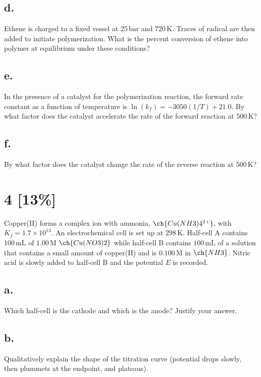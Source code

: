 \documentclass[11pt]{article}
\begin{document}
\subsection*{d.} Ethene is charged to a fixed vessel at $25\,\text{bar}$ and $720\,\text{K}$. Traces of radical are then added to initiate polymerization. What is the percent conversion of ethene into polymer at equilibrium under these conditions?
\vspace{4cm}

\subsection*{e.} In the presence of a catalyst for the polymerization reaction, the forward rate constant as a function of temperature is $\ln(k_f) = -3050(1/T) + 21.0$. By what factor does the catalyst accelerate the rate of the forward reaction at $500\,\text{K}$?
\vspace{3cm}

\subsection*{f.} By what factor does the catalyst change the rate of the reverse reaction at $500\,\text{K}$?
\vspace{2cm}

\newpage
\section{4 [13\%]}
Copper(II) forms a complex ion with ammonia, $\ch{Cu(NH3)4^{2+}}$, with $K_f = 1.7\times10^{13}$. An electrochemical cell is set up at $298\,\text{K}$. Half-cell A contains $100\,\text{mL}$ of $1.00\,\text{M}$ $\ch{Cu(NO3)2}$ while half-cell B contains $100\,\text{mL}$ of a solution that contains a small amount of copper(II) and is $0.100\,\text{M}$ in $\ch{NH3}$. Nitric acid is slowly added to half-cell B and the potential $E$ is recorded.

\subsection*{a.} Which half-cell is the cathode and which is the anode? Justify your answer.
\vspace{3cm}

\subsection*{b.} Qualitatively explain the shape of the titration curve (potential drops slowly, then plummets at the endpoint, and plateaus).
\vspace{3cm}
\end{document}
